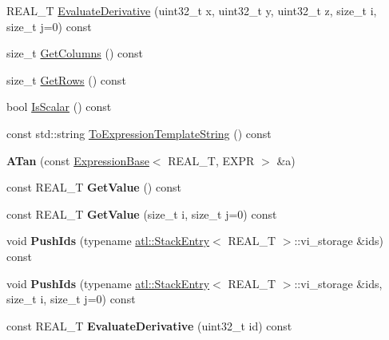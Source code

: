 \begin{DoxyCompactItemize}
R\+E\+A\+L\+\_\+\+T \hyperlink{structatl_1_1_a_tan_a48e1ff6400417eb0c724dba601bca61e}{Evaluate\+Derivative} (uint32\+\_\+t x, uint32\+\_\+t y, uint32\+\_\+t z, size\+\_\+t i, size\+\_\+t j=0) const 
\item 
size\+\_\+t \hyperlink{structatl_1_1_a_tan_a31a96dee4a7fb125fc32ab71be032c57}{Get\+Columns} () const 
\item 
size\+\_\+t \hyperlink{structatl_1_1_a_tan_a043abd1506434e38c581beb3da5182e8}{Get\+Rows} () const 
\item 
bool \hyperlink{structatl_1_1_a_tan_a0f3aa3f9327f314b64487f30a9ce0b75}{Is\+Scalar} () const 
\item 
const std\+::string \hyperlink{structatl_1_1_a_tan_a61c7cb4513cf240b4cff54350dfd4fe3}{To\+Expression\+Template\+String} () const 
\item 
\hypertarget{structatl_1_1_a_tan_add096151fe20c8632a60c964878a4902}{{\bfseries A\+Tan} (const \hyperlink{structatl_1_1_expression_base}{Expression\+Base}$<$ R\+E\+A\+L\+\_\+\+T, E\+X\+P\+R $>$ \&a)}\label{structatl_1_1_a_tan_add096151fe20c8632a60c964878a4902}

\item 
\hypertarget{structatl_1_1_a_tan_a0f02fc43a4a82a876e014d7fdaa1a0d9}{const R\+E\+A\+L\+\_\+\+T {\bfseries Get\+Value} () const }\label{structatl_1_1_a_tan_a0f02fc43a4a82a876e014d7fdaa1a0d9}

\item 
\hypertarget{structatl_1_1_a_tan_a8eca69dbb72c27a6329e585e38390b47}{const R\+E\+A\+L\+\_\+\+T {\bfseries Get\+Value} (size\+\_\+t i, size\+\_\+t j=0) const }\label{structatl_1_1_a_tan_a8eca69dbb72c27a6329e585e38390b47}

\item 
\hypertarget{structatl_1_1_a_tan_a687a1c79d9db4f2185eabfa553103a2d}{void {\bfseries Push\+Ids} (typename \hyperlink{structatl_1_1_stack_entry}{atl\+::\+Stack\+Entry}$<$ R\+E\+A\+L\+\_\+\+T $>$\+::vi\+\_\+storage \&ids) const }\label{structatl_1_1_a_tan_a687a1c79d9db4f2185eabfa553103a2d}

\item 
\hypertarget{structatl_1_1_a_tan_ab5452739c72b6a25edba0ea6e0bb2a46}{void {\bfseries Push\+Ids} (typename \hyperlink{structatl_1_1_stack_entry}{atl\+::\+Stack\+Entry}$<$ R\+E\+A\+L\+\_\+\+T $>$\+::vi\+\_\+storage \&ids, size\+\_\+t i, size\+\_\+t j=0) const }\label{structatl_1_1_a_tan_ab5452739c72b6a25edba0ea6e0bb2a46}

\item 
\hypertarget{structatl_1_1_a_tan_a8764410db8db30cd2aecf92114133649}{const R\+E\+A\+L\+\_\+\+T {\bfseries Evaluate\+Derivative} (uint32\+\_\+t id) const }\label{structatl_1_1_a_tan_a8764410db8db30cd2aecf92114133649}


\end{DoxyCompactItemize}
